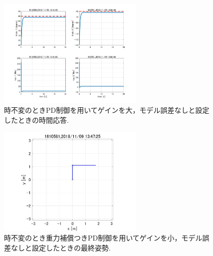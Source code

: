 \documentclass[twocolumn, 10pt,a4j]{jsarticle}
\begin{document}
    \begin{figure}[H]
      \begin{center}
        \includegraphics[width=7cm]{../img/img/kansetu_PD_zifuhen_large_no_model_gosa_zikan_auto.jpg}
        \caption{時不変のときPD制御を用いてゲインを大，モデル誤差なしと設定したときの時間応答.}
      \end{center}
    \end{figure}
    \begin{figure}[H]
      \begin{center}
        \includegraphics[width=7cm]{../img/img/kansetu_juryoku_hosyou_PD_zifuhen_small_no_model_gosa_saisyu_sisei.jpg}
        \caption{時不変のとき重力補償つきPD制御を用いてゲインを小，モデル誤差なしと設定したときの最終姿勢.}
      \end{center}
    \end{figure}
\end{document}
